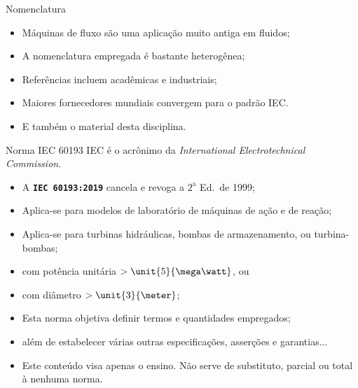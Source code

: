     \begin{frame}{Nomenclatura}\vspace*{-1em}
        \begin{itemize}
            \item<1-> Máquinas de fluxo são uma \alert{aplicação muito antiga} em fluidos;
            \item<1-> A \alert{nomenclatura} empregada é \alert{bastante heterogênea};
            \item<2-> Referências incluem \alert{acadêmicas} e \alert{industriais};
            \item<2-> \alert{Maiores fornecedores mundiais} convergem para o \alert{padrão IEC}.
            \item<3-> E também o material desta disciplina.
        \end{itemize}
    \end{frame}

    \begin{frame}{Norma IEC 60193}\vspace*{-1em}
        IEC é o acrônimo da \textit{International Electrotechnical Commission\/}.
        \vspace*{\medskipamount}

        \begin{itemize}
            \item<1-> A \alert{\textbf{\texttt{IEC 60193:2019}}} cancela e revoga a
                $2^{\mathrm{a}}$ Ed.~de 1999;
            \item<1-> Aplica-se para \alert{modelos de laboratório} de máquinas de \alert{ação}
                e de \alert{reação};
            \item<1-> Aplica-se para \alert{turbinas hidráulicas}, \alert{bombas de
                armazenamento}, ou \alert{turbina-bombas};
            \item<2-> com \alert{potência unitária $> \unit{5}{\mega\watt}$}, ou
            \item<2-> com \alert{diâmetro $> \unit{3}{\meter}$};
            \item<3-> Esta norma objetiva \alert{definir termos e quantidades} empregados;
            \item<3-> além de estabelecer várias outras \alert{especificações},
                \alert{asserções} e \alert{garantias}...
            \item<3-> Este conteúdo visa apenas o ensino. Não serve de substituto, parcial ou
                total à nenhuma norma.
        \end{itemize}
    \end{frame}

